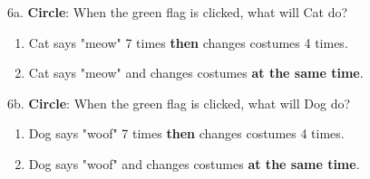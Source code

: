 \noindent 6a. \textbf{Circle}: When the green flag is clicked, what will Cat do?
\renewcommand{\theenumi}{\Alph{enumi}}
\begin{enumerate}
\item Cat says "meow" 7 times \textbf{then} changes costumes 4 times.
\item Cat says "meow" and changes costumes \textbf{at the same time}. \\
\end{enumerate}

\noindent 6b. \textbf{Circle}: When the green flag is clicked, what will Dog do?
\renewcommand{\theenumi}{\Alph{enumi}}
\begin{enumerate}
\item Dog says "woof" 7 times \textbf{then} changes costumes 4 times.
\item Dog says "woof" and changes costumes \textbf{at the same time}.
\end{enumerate}

\noindent \dotfill \\
